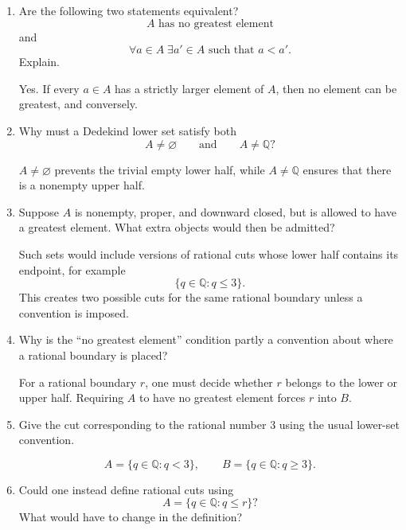 \documentclass{essay}
\begin{document}
\begin{enumerate}[label=\arabic*., itemsep=10pt]
\item Are the following two statements equivalent?
\[
\text{$A$ has no greatest element}
\]
and
\[
\forall a\in A\;\exists a'\in A\text{ such that }a<a'.
\]
Explain.

\begin{answer}
Yes. If every $a\in A$ has a strictly larger element of $A$, then no element can be greatest, and conversely.
\end{answer}

\item Why must a Dedekind lower set satisfy both
\[
A\neq\varnothing
\qquad\text{and}\qquad
A\neq\mathbb{Q}?
\]

\begin{answer}
$A\neq\varnothing$ prevents the trivial empty lower half, while $A\neq\mathbb{Q}$ ensures that there is a nonempty upper half.
\end{answer}

\item Suppose $A$ is nonempty, proper, and downward closed, but is allowed to have a greatest element.
What extra objects would then be admitted?

\begin{answer}
Such sets would include versions of rational cuts whose lower half contains its endpoint, for example
\[
\{q\in\mathbb{Q}:q\le 3\}.
\]
This creates two possible cuts for the same rational boundary unless a convention is imposed.
\end{answer}

\item Why is the ``no greatest element'' condition partly a convention about where a rational boundary is placed?

\begin{answer}
For a rational boundary $r$, one must decide whether $r$ belongs to the lower or upper half. Requiring $A$ to have no greatest element forces $r$ into $B$.
\end{answer}

\item Give the cut corresponding to the rational number $3$ using the usual lower-set convention.

\begin{answer}
\[
A=\{q\in\mathbb{Q}:q<3\},\qquad
B=\{q\in\mathbb{Q}:q\ge 3\}.
\]
\end{answer}

\item Could one instead define rational cuts using
\[
A=\{q\in\mathbb{Q}:q\le r\}?
\]
What would have to change in the definition?


\end{enumerate}
\end{document}
